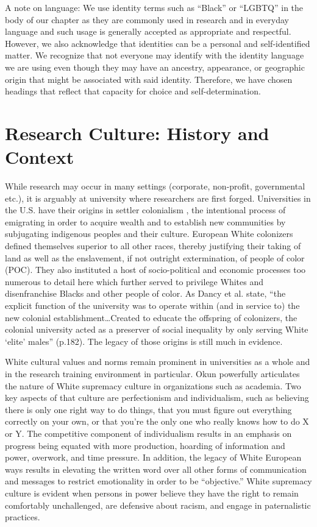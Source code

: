 \documentclass[
  11pt,
]{book}
\begin{document}
A note on language: We use identity terms such as ``Black'' or ``LGBTQ'' in the body of our chapter as they are commonly used in research and in everyday language and such usage is generally accepted as appropriate and respectful. However, we also acknowledge that identities can be a personal and self-identified matter. We recognize that not everyone may identify with the identity language we are using even though they may have an ancestry, appearance, or geographic origin that might be associated with said identity. Therefore, we have chosen headings that reflect that capacity for choice and self-determination.

\section{Research Culture: History and Context}\label{research-culture-history-and-context}

While research may occur in many settings (corporate, non-profit, governmental etc.), it is arguably at university where researchers are first forged. Universities in the U.S. have their origins in settler colonialism \citep{dancy_historically_2018}, the intentional process of emigrating in order to acquire wealth and to establish new communities by subjugating indigenous peoples and their culture. European White colonizers defined themselves superior to all other races, thereby justifying their taking of land as well as the enslavement, if not outright extermination, of people of color (POC). They also instituted a host of socio-political and economic processes too numerous to detail here which further served to privilege Whites and disenfranchise Blacks and other people of color. As Dancy et al. \citeyearpar{dancy_historically_2018} state, ``the explicit function of the university was to operate within (and in service to) the new colonial establishment\ldots Created to educate the offspring of colonizers, the colonial university acted as a preserver of social inequality by only serving White `elite' males'' (p.182). The legacy of those origins is still much in evidence.

White cultural values and norms remain prominent in universities as a whole and in the research training environment in particular. Okun \citeyearpar{okun_white_2021} powerfully articulates the nature of White supremacy culture in organizations such as academia. Two key aspects of that culture are perfectionism and individualism, such as believing there is only one right way to do things, that you must figure out everything correctly on your own, or that you're the only one who really knows how to do X or Y. The competitive component of individualism results in an emphasis on progress being equated with more production, hoarding of information and power, overwork, and time pressure. In addition, the legacy of White European ways results in elevating the written word over all other forms of communication and messages to restrict emotionality in order to be ``objective.'' White supremacy culture is evident when persons in power believe they have the right to remain comfortably unchallenged, are defensive about racism, and engage in paternalistic practices.
\end{document}
